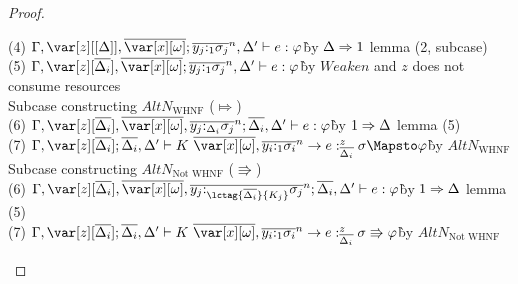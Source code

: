 \begin{proof}
\begin{description}
\begin{tabbing}
    (4) $\G,\z[\irr{\D}],\ov{\xo};\ov{y_j{:}_{1}\s_j}^n, \D' \vdash e : \vp$\`by $\Delta \Rightarrow 1$ lemma (2, subcase)\\
    (5) $\G,\z[\ov{\D_i}],\ov{\xo};\ov{y_j{:}_{1}\s_j}^n, \D' \vdash e : \vp$\`by $Weaken$ and $z$ does not consume resources\\
    Subcase constructing $AltN_{\textrm{WHNF}}$ ($\Mapsto$)\\
    (6) $\G,\z[\ov{\D_i}],\ov{\xo},\ov{y_j{:}_{\D_i}\s_j}^n; \ov{\D_i}, \D' \vdash e : \vp$\`by $1 \Rightarrow \Delta$ lemma (5)\\
    (7) $\G,\z[\ov{\D_i}]; \ov{\D_i}, \D' \vdash K~\ov{\xo},\ov{y_i{:}_{1}\s_i}^n\to e :^z_{\ov{\D_i}} \s \Mapsto \vp$\`by $AltN_{\textrm{WHNF}}$\\
    Subcase constructing $AltN_{\textrm{Not WHNF}}$ ($\Rrightarrow$)\\
    (6) $\G,\z[\ov{\D_i}],\ov{\xo},\ov{y_j{:}_{\lctag{\ov{\D_i}}{K_j}}\s_j}^n; \ov{\D_i}, \D' \vdash e : \vp$\`by $1 \Rightarrow \Delta$ lemma (5)\\
    (7) $\G,\z[\ov{\D_i}]; \ov{\D_i}, \D' \vdash K~\ov{\xo},\ov{y_i{:}_{1}\s_i}^n\to e :^z_{\ov{\D_i}} \s \Rrightarrow \vp$\`by $AltN_{\textrm{Not WHNF}}$\\
\end{tabbing}

\end{description}
\end{proof}

